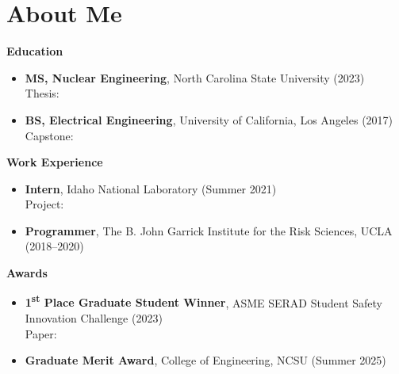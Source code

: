 \section*{About Me}
\begin{frame}[t]
\textbf{Education}
\vspace{2pt}
{\smaller[1]
\begin{itemize}
\setlength{\baselineskip}{2pt}
    \item {
    \textbf{MS, Nuclear Engineering}, North Carolina State University (2023)\\
    {{\smaller[1.2]Thesis: \color{red600}{"Integrating Dual Error Propagation into Dynamic Event Trees to Support Fission Battery Probabilistic Risk Assessments"}}}
    }
    \vspace{4pt}
    \item {\textbf{BS, Electrical Engineering}, University of California, Los Angeles (2017)\\
    {{\smaller[1.2]Capstone: \color{red600}{"Integer Hardware Optimizations on TI-C6000 DSPs for Low-Power IoT Applications"}}}
    }
\end{itemize}
}
\vspace{8pt}
\textbf{Work Experience}
{\smaller[1]
\begin{itemize}
\setlength{\baselineskip}{2pt}
    \item{\textbf{Intern}, Idaho National Laboratory (Summer 2021)\\
        {{\smaller[1.2]Project: \color{red600}{Coupled OpenPRA's OpenEPL engine with EMRALD.}}}
    }
    \vspace{2pt}
    \item{\textbf{Programmer}, The B. John Garrick Institute for the Risk Sciences, UCLA (2018--2020)\\
    {{\smaller[1.2]\color{red600}{Developed the Hybrid Causal Logic and Phoenix human reliability assessment web applications.}}}
    }
\end{itemize}
}
\vspace{8pt}
\textbf{Awards}
{\smaller[1]
\begin{itemize}
    \item{\textbf{1\textsuperscript{st} Place Graduate Student Winner}, ASME SERAD Student Safety Innovation Challenge (2023)\\
    {{\smaller[1.2]Paper: \color{red600}{Introducing OpenPRA: A Web-Based Framework for Collaborative Probabilistic Risk Assessment}}}
    }
    \item{\textbf{Graduate Merit Award}, College of Engineering, NCSU (Summer 2025)
    }
\end{itemize}
} 
\end{frame}